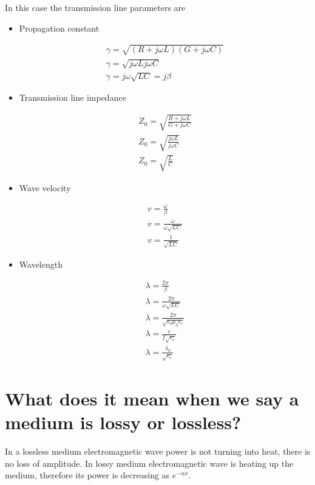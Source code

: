 \documentclass{ximera}
\begin{document}
In this case the transmission line parameters are
\begin{itemize}
\item Propagation constant


\begin{eqnarray}
\gamma =\sqrt{(R+j\omega L)(G+ j\omega C)} \nonumber   \\ \nonumber
\gamma= \sqrt{j \omega L j \omega C} \\ \nonumber
\gamma = j \omega \sqrt{L C} = j \beta
\end{eqnarray}

\item Transmission line impedance 

\begin{eqnarray}
Z_0=\sqrt{\frac{R+j\omega L}{G+ j\omega C}} \nonumber  \\ \nonumber
Z_0=\sqrt{\frac{j\omega L}{ j\omega C}} \\ \nonumber
Z_0=\sqrt{\frac{L}{C}}
\end{eqnarray}

\item Wave velocity

\begin{eqnarray}
v=\frac{\omega}{\beta}  \nonumber \\ \nonumber
v=\frac{\omega}{\omega \sqrt{LC}} \\ \nonumber
v=\frac{1}{\sqrt{LC}}
\end{eqnarray}


\item Wavelength


\begin{eqnarray}
\lambda = \frac{2 \pi}{\beta}  \nonumber \\ \nonumber
\lambda = \frac{2 \pi}{ \omega \sqrt{LC}} \\ \nonumber
\lambda =\frac{2 \pi}{\sqrt{\epsilon_0 \mu_0 \epsilon_r} } \\ \nonumber
\lambda = \frac{c}{f \sqrt{\epsilon_r}} \\ \nonumber
\lambda = \frac{\lambda_0}{\sqrt{\epsilon_r}} \nonumber
\end{eqnarray}
\end{itemize}






\section{What does it mean when we say a medium is lossy or lossless?}
In a lossless medium electromagnetic wave power is not turning into heat, there is no loss of amplitude. In lossy medium electromagnetic wave is heating up the medium, therefore its power is decreasing as $e^{-\alpha x}$.
\end{document}
